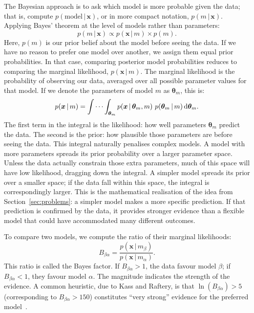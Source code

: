 \documentclass[reprint,superscriptaddress,nobibnotes,nofootinbib,amsmath,amssymb,aps,hidelinks]{revtex4-2}
\newcommand{\pr}[2]{p(#1\,|\,#2)}
\begin{document}
The Bayesian approach is to ask which model is more probable given the data; that is, compute $\pr{\mathrm{model}}{\bm{x}}$, or in more compact notation, $\pr{m}{\bm{x}}$. 
Applying Bayes' theorem at the level of models rather than parameters:
\begin{equation}
\pr{m}{\bm{x}} \propto \pr{\bm{x}}{m} \times p(m).
\end{equation}
Here, $p(m)$ is our prior belief about the model before seeing the data. 
If we have no reason to prefer one model over another, we assign them equal prior probabilities. 
In that case, comparing posterior model probabilities reduces to comparing the marginal likelihood, $\pr{\bm{x}}{m}$.
The marginal likelihood is the probability of observing our data, averaged over all possible parameter values for that model. 
If we denote the parameters of model $m$ as $\bm{\theta}_m$, this is:
\begin{equation}
\pr{\bm{x}}{m} = \idotsint_{\bm{\theta}_m} \pr{\bm{x}}{\bm{\theta}_m, m} \,\, \pr{\bm{\theta}_m}{m}\,\mathrm{d}\bm{\theta}_m.
\end{equation}
The first term in the integral is the likelihood: how well parameters $\bm{\theta}_m$ predict the data. 
The second is the prior: how plausible those parameters are before seeing the data.
This integral naturally penalises complex models. 
A model with more parameters spreads its prior probability over a larger parameter space. 
Unless the data actually constrain those extra parameters, much of this space will have low likelihood, dragging down the integral. 
A simpler model spreads its prior over a smaller space; if the data fall within this space, the integral is correspondingly larger.
This is the mathematical realisation of the idea from Section~\ref{sec:problems}: a simpler model makes a more specific prediction. 
If that prediction is confirmed by the data, it provides stronger evidence than a flexible model that could have accommodated many different outcomes.

To compare two models, we compute the ratio of their marginal likelihoods:
\begin{equation}
B_{\beta\alpha} = \frac{\pr{\bm{x}}{m_\beta}}{\pr{\bm{x}}{m_\alpha}}.
\end{equation}
This ratio is called the Bayes factor. 
If $B_{\beta\alpha} > 1$, the data favour model $\beta$; if $B_{\beta\alpha} < 1$, they favour model $\alpha$. 
The magnitude indicates the strength of the evidence. 
A common heuristic, due to Kass and Raftery, is that $\ln(B_{\beta\alpha}) > 5$ (corresponding to $B_{\beta\alpha} > 150$) constitutes ``very strong'' evidence for the preferred model~\cite{Kass1995}.
\end{document}
